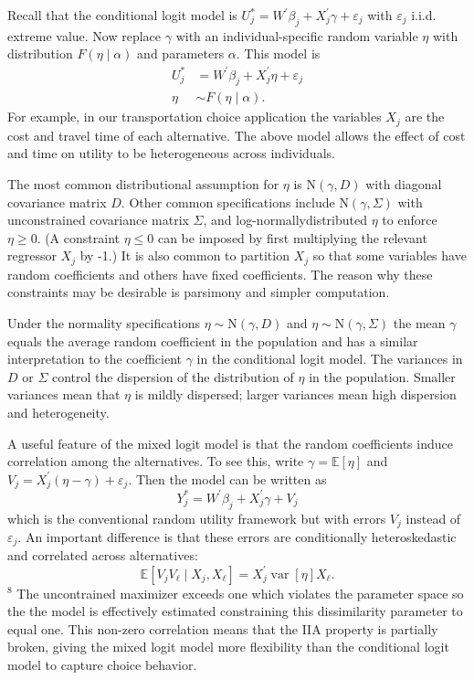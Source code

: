 \documentclass[10pt]{article}
\begin{document}
Recall that the conditional logit model is $U_{j}^{*}=W^{\prime} \beta_{j}+X_{j}^{\prime} \gamma+\varepsilon_{j}$ with $\varepsilon_{j}$ i.i.d. extreme value. Now replace $\gamma$ with an individual-specific random variable $\eta$ with distribution $F(\eta \mid \alpha)$ and parameters $\alpha$. This model is
$$
\begin{aligned}
U_{j}^{*} &=W^{\prime} \beta_{j}+X_{j}^{\prime} \eta+\varepsilon_{j} \\
\eta & \sim F(\eta \mid \alpha) .
\end{aligned}
$$
For example, in our transportation choice application the variables $X_{j}$ are the cost and travel time of each alternative. The above model allows the effect of cost and time on utility to be heterogeneous across individuals.

The most common distributional assumption for $\eta$ is $\mathrm{N}(\gamma, D)$ with diagonal covariance matrix $D$. Other common specifications include $\mathrm{N}(\gamma, \Sigma)$ with unconstrained covariance matrix $\Sigma$, and log-normallydistributed $\eta$ to enforce $\eta \geq 0$. (A constraint $\eta \leq 0$ can be imposed by first multiplying the relevant regressor $X_{j}$ by -1.) It is also common to partition $X_{j}$ so that some variables have random coefficients and others have fixed coefficients. The reason why these constraints may be desirable is parsimony and simpler computation.

Under the normality specifications $\eta \sim \mathrm{N}(\gamma, D)$ and $\eta \sim \mathrm{N}(\gamma, \Sigma)$ the mean $\gamma$ equals the average random coefficient in the population and has a similar interpretation to the coefficient $\gamma$ in the conditional logit model. The variances in $D$ or $\Sigma$ control the dispersion of the distribution of $\eta$ in the population. Smaller variances mean that $\eta$ is mildly dispersed; larger variances mean high dispersion and heterogeneity.

A useful feature of the mixed logit model is that the random coefficients induce correlation among the alternatives. To see this, write $\gamma=\mathbb{E}[\eta]$ and $V_{j}=X_{j}^{\prime}(\eta-\gamma)+\varepsilon_{j}$. Then the model can be written as
$$
Y_{j}^{*}=W^{\prime} \beta_{j}+X_{j}^{\prime} \gamma+V_{j}
$$
which is the conventional random utility framework but with errors $V_{j}$ instead of $\varepsilon_{j}$. An important difference is that these errors are conditionally heteroskedastic and correlated across alternatives:
$$
\mathbb{E}\left[V_{j} V_{\ell} \mid X_{j}, X_{\ell}\right]=X_{j}^{\prime} \operatorname{var}[\eta] X_{\ell} .
$$
${ }^{8}$ The uncontrained maximizer exceeds one which violates the parameter space so the the model is effectively estimated constraining this dissimilarity parameter to equal one. This non-zero correlation means that the IIA property is partially broken, giving the mixed logit model more flexibility than the conditional logit model to capture choice behavior.
\end{document}
